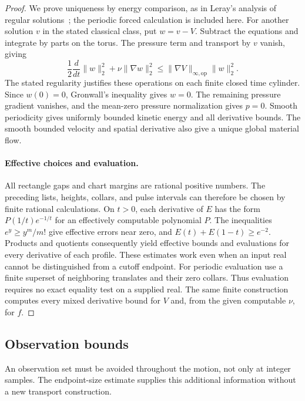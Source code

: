 \documentclass[11pt]{article}
\theoremstyle{remark}
\begin{document}
\begin{proof}
We prove uniqueness by energy comparison, as in Leray's analysis of
regular solutions~\cite[Section~18]{Leray}; the periodic forced
calculation is included here. For another solution $v$ in the stated
classical class, put $w=v-V$.
Subtract the equations and integrate by parts on the torus. The pressure
term and transport by $v$ vanish, giving
\[
 \frac12\frac{d}{dt}\|w\|_2^2+\nu\|\nabla w\|_2^2
 \le \|\nabla V\|_{\infty,\mathrm{op}}\|w\|_2^2.
\]
The stated regularity justifies these operations on each finite closed
time cylinder. Since $w(0)=0$, Gronwall's inequality gives $w=0$.
The remaining pressure gradient vanishes, and the mean-zero pressure
normalization gives $p=0$. Smooth periodicity gives uniformly bounded
kinetic energy and all derivative bounds. The smooth bounded velocity
and spatial derivative also give a unique global material flow.

\paragraph{Effective choices and evaluation.}
All rectangle gaps and chart margins are rational positive numbers.
The preceding lists, heights, collars, and pulse intervals can
therefore be chosen by finite rational calculations. On $t>0$, each
derivative of $E$ has the form $P(1/t)e^{-1/t}$ for an effectively
computable polynomial $P$. The inequalities
$e^y\ge y^m/m!$ give effective errors near zero, and
$E(t)+E(1-t)\ge e^{-2}$. Products and quotients consequently yield
effective bounds and evaluations for every derivative of each profile.
These estimates work even when an input real cannot be distinguished
from a cutoff endpoint. For periodic evaluation use a finite superset
of neighboring translates and their zero collars. Thus evaluation
requires no exact equality test on a supplied real. The same finite
construction computes every mixed derivative bound for $V$ and, from
the given computable $\nu$, for $f$.
\end{proof}

\subsection{Observation bounds}
An observation set must be avoided throughout the motion, not only
at integer samples. The endpoint-size estimate supplies this additional
information without a new transport construction.
\end{document}
